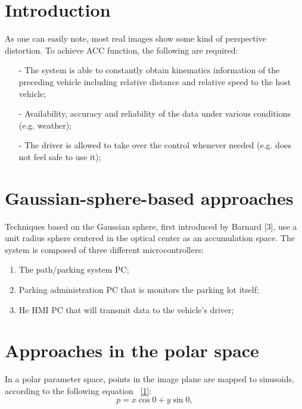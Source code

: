 \documentclass[12pt]{article}
\begin{document}
\tableofcontents
\newpage
\section {Introduction}

\raggedright As one can easily note, most real images show some kind of perspective distortion. To achieve ACC function, the following are required:
\newline
\begin{itemize}
    \item[-] The system is able to constantly obtain kinematics information of the preceding vehicle including relative distance and relative speed to the host vehicle;
    \item[-] Availability, accuracy and reliability of the data under various conditions (e.g. weather);
    \item[-] The driver is allowed to take over the control whenever needed (e.g. does not feel safe to use it);
\end{itemize}
\hspace{5mm}
\section {Gaussian-sphere-based approaches}

\raggedright Techniques based on the Gaussian sphere, first introduced by Barnard [3], use a unit radius sphere centered in the optical center as an accumulation space. The system is composed of three different microcontrollers:
\noindent
\begin{enumerate}
\item The path/parking system PC;
\item Parking administration PC that is monitors the parking lot itself;
\item He HMI PC that will transmit data to the vehicle's driver;
\end{enumerate}

\hspace{5mm}
\section {Approaches in the polar space}

\raggedright In a polar parameter space, points in the image plane are mapped to sinusoids, according to the following equation ~\eqref{1}:
\noindent
\begin{equation}\label{1}
p = x{\cos⁡{0}} + y{\sin{⁡0}},
\end{equation}
\end{document}
